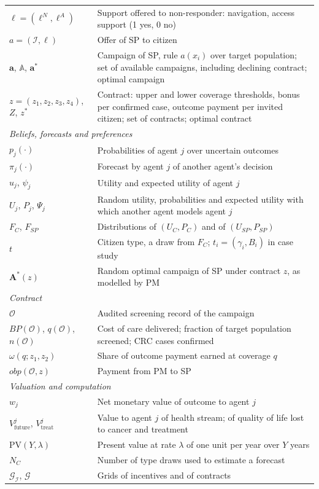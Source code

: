 \documentclass[12pt]{article}
\begin{document}
\begin{table}[htbp]
\begin{tabular}{l p{11.5cm}}
$\ell = (\ell^{N}, \ell^{A})$ & Support offered to non-responder: navigation, access support (1 yes, 0 no) \\
$a = (\mathcal{I}, \ell)$ & Offer of SP to citizen \\
$\mathbf{a}$, $\mathbb{A}$, $\mathbf{a}^*$ & Campaign of SP,  rule $a(x_i)$ over target population; set of available campaigns, including declining contract; optimal campaign \\
$z = (z_1, z_2, z_3, z_4)$, $Z$, $z^*$ & Contract: upper and lower coverage thresholds, bonus per confirmed case, outcome payment per invited citizen; set of contracts; optimal contract \\
\midrule
\multicolumn{2}{l}{\emph{Beliefs, forecasts and preferences}} \\
$p_j(\cdot)$ & Probabilities of agent $j$ over uncertain outcomes \\
$\pi_j(\cdot)$ & Forecast by agent $j$ of another agent's decision \\
$u_j$, $\psi_j$ & Utility and expected utility of agent $j$ \\
$U_j$, $P_j$, $\Psi_j$ & Random utility, probabilities and expected utility with which another agent models agent $j$ \\
$F_C$, $F_{SP}$ & Distributions of $(U_C, P_C)$ and of $(U_{SP}, P_{SP})$ \\
$t$ & Citizen type, a draw from $F_C$; $t_i = (\gamma_i, B_i)$ in case study \\
$\mathbf{A}^*(z)$ & Random optimal campaign of SP under contract $z$, as modelled by PM \\
\midrule
\multicolumn{2}{l}{\emph{Contract}} \\
$\mathcal{O}$ & Audited screening record of the campaign \\
$BP(\mathcal{O})$, $q(\mathcal{O})$, $n(\mathcal{O})$ & Cost of care delivered; fraction of target population screened; CRC cases confirmed \\
$\omega(q; z_1, z_2)$ & Share of outcome payment earned at coverage $q$ \\
$obp(\mathcal{O}, z)$ & Payment from PM to SP \\
\midrule
\multicolumn{2}{l}{\emph{Valuation and computation}} \\
$w_j$ & Net monetary value of outcome to agent $j$ \\
$V^{j}_{\text{future}}$, $V^{j}_{\text{treat}}$ & Value to agent $j$ of health stream; of quality of life lost to cancer and treatment \\
$\mathrm{PV}(Y, \lambda)$ & Present value at rate $\lambda$ of one unit per year over $Y$ years \\
$N_C$ & Number of type draws used to estimate a forecast \\
$\mathcal{G}_{\mathcal{I}}$, $\mathcal{G}$ & Grids of incentives and of contracts \\
\bottomrule
\end{tabular}
\end{table}
\end{document}
